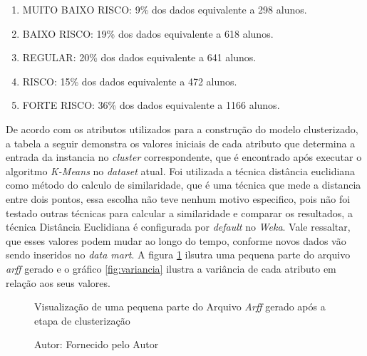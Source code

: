\begin{enumerate}
\item MUITO BAIXO RISCO: 9\% dos dados equivalente a 298 alunos.
\item BAIXO RISCO: 19\% dos dados equivalente a 618 alunos.
\item REGULAR: 20\% dos dados equivalente a 641 alunos.
\item RISCO: 15\% dos dados equivalente a 472 alunos.
\item FORTE RISCO: 36\% dos dados equivalente a 1166 alunos.
\end{enumerate}

De acordo com os atributos utilizados para a construção do modelo clusterizado, a tabela a seguir demonstra os valores iniciais de cada atributo que determina a entrada da instancia no \textit{cluster} correspondente, que é encontrado após executar o algoritmo \textit{K-Means} no \textit{dataset} atual. Foi utilizada a técnica distância euclidiana como método do calculo de similaridade, que é uma técnica que mede a distancia entre dois pontos, essa escolha não teve nenhum motivo especifico, pois não foi testado outras técnicas para calcular a similaridade e comparar os resultados, a técnica Distância Euclidiana é configurada por \textit{default} no \textit{Weka}. Vale ressaltar, que esses valores podem mudar ao longo do tempo, conforme novos dados vão sendo inseridos no \textit{data mart}. A figura \ref{fig:arff} ilsutra uma pequena parte do arquivo \textit{arff} gerado e o gráfico \ref{fig:variancia} ilustra a variância de cada atributo em relação aos seus valores.

\begin{figure}[!ht]
\caption{Visualização de uma pequena parte do Arquivo \textit{Arff} gerado após a etapa de clusterização}
\centering
{}
\caption*{Autor: Fornecido pelo Autor}
\label{fig:arff}
\end{figure}

